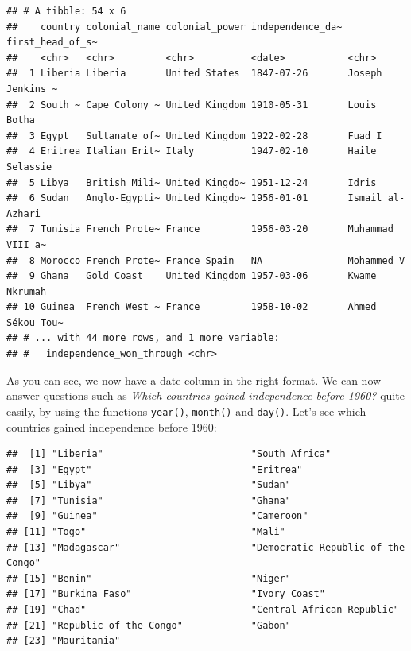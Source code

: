 \documentclass[]{gitbook}
\newenvironment{Shaded}{\begin{snugshade}}{\end{snugshade}}
\newcommand{\DecValTok}[1]{\textcolor[rgb]{0.00,0.00,0.81}{#1}}
\newcommand{\KeywordTok}[1]{\textcolor[rgb]{0.13,0.29,0.53}{\textbf{#1}}}
\newcommand{\NormalTok}[1]{#1}
\newcommand{\OperatorTok}[1]{\textcolor[rgb]{0.81,0.36,0.00}{\textbf{#1}}}
\newcommand{\StringTok}[1]{\textcolor[rgb]{0.31,0.60,0.02}{#1}}
\begin{document}
\begin{verbatim}
## # A tibble: 54 x 6
##    country colonial_name colonial_power independence_da~ first_head_of_s~
##    <chr>   <chr>         <chr>          <date>           <chr>           
##  1 Liberia Liberia       United States  1847-07-26       Joseph Jenkins ~
##  2 South ~ Cape Colony ~ United Kingdom 1910-05-31       Louis Botha     
##  3 Egypt   Sultanate of~ United Kingdom 1922-02-28       Fuad I          
##  4 Eritrea Italian Erit~ Italy          1947-02-10       Haile Selassie  
##  5 Libya   British Mili~ United Kingdo~ 1951-12-24       Idris           
##  6 Sudan   Anglo-Egypti~ United Kingdo~ 1956-01-01       Ismail al-Azhari
##  7 Tunisia French Prote~ France         1956-03-20       Muhammad VIII a~
##  8 Morocco French Prote~ France Spain   NA               Mohammed V      
##  9 Ghana   Gold Coast    United Kingdom 1957-03-06       Kwame Nkrumah   
## 10 Guinea  French West ~ France         1958-10-02       Ahmed Sékou Tou~
## # ... with 44 more rows, and 1 more variable:
## #   independence_won_through <chr>
\end{verbatim}

As you can see, we now have a date column in the right format. We can now answer questions such as
\emph{Which countries gained independence before 1960?} quite easily, by using the functions \texttt{year()},
\texttt{month()} and \texttt{day()}. Let's see which countries gained independence before 1960:

\begin{Shaded}
\end{Shaded}

\begin{verbatim}
##  [1] "Liberia"                          "South Africa"                    
##  [3] "Egypt"                            "Eritrea"                         
##  [5] "Libya"                            "Sudan"                           
##  [7] "Tunisia"                          "Ghana"                           
##  [9] "Guinea"                           "Cameroon"                        
## [11] "Togo"                             "Mali"                            
## [13] "Madagascar"                       "Democratic Republic of the Congo"
## [15] "Benin"                            "Niger"                           
## [17] "Burkina Faso"                     "Ivory Coast"                     
## [19] "Chad"                             "Central African Republic"        
## [21] "Republic of the Congo"            "Gabon"                           
## [23] "Mauritania"
\end{verbatim}
\end{document}
